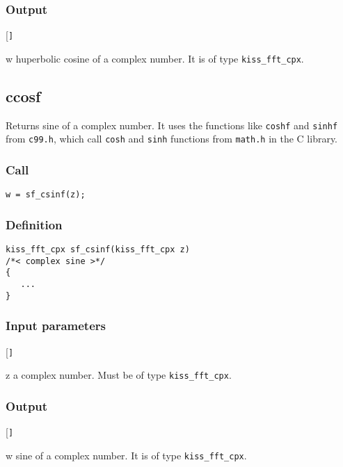 \subsubsection*{Output}
\begin{desclist}{\tt }{\quad}[\tt ]
   \setlength\itemsep{0pt}
   \item[w] huperbolic cosine of a complex number. It is of type \texttt{kiss\_fft\_cpx}.
\end{desclist}




\subsection{{ccosf}}
Returns sine of a complex number. It uses the functions like \texttt{coshf} and \texttt{sinhf} from \texttt{c99.h}, which call \texttt{cosh} and \texttt{sinh} functions from \texttt{math.h} in the C library.

\subsubsection*{Call}
\begin{verbatim}w = sf_csinf(z);\end{verbatim}

\subsubsection*{Definition}
\begin{verbatim}
kiss_fft_cpx sf_csinf(kiss_fft_cpx z)
/*< complex sine >*/
{
   ...
}
\end{verbatim}

\subsubsection*{Input parameters}
\begin{desclist}{\tt }{\quad}[\tt ]
   \setlength\itemsep{0pt}
   \item[z] a complex number. Must be of type \texttt{kiss\_fft\_cpx}.
\end{desclist}

\subsubsection*{Output}
\begin{desclist}{\tt }{\quad}[\tt ]
   \setlength\itemsep{0pt}
   \item[w] sine of a complex number. It is of type \texttt{kiss\_fft\_cpx}.
\end{desclist}




